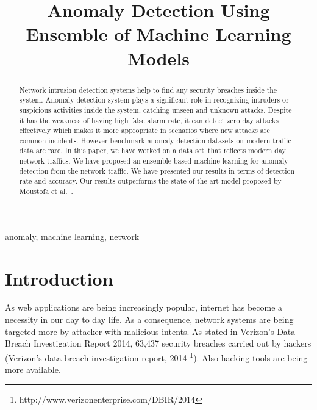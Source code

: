 \documentclass[14pt, conference]{IEEEtran}
\begin{document}
\title{Anomaly Detection Using Ensemble of Machine Learning Models}

\author{
}

\maketitle

\begin{abstract}

Network intrusion detection systems help to find any security breaches inside the system. Anomaly detection system plays a significant role in recognizing intruders or suspicious activities inside the system, catching unseen and unknown attacks. Despite it has the weakness of having high false alarm rate, it can detect zero day attacks effectively which makes it more appropriate in scenarios where new attacks are common incidents. However benchmark anomaly detection datasets on modern traffic data are rare. In this paper, we have  worked on a data set\cite{moustafa2015unsw}~that reflects modern day network traffics. We have proposed  an ensemble based machine learning for anomaly detection from the network traffic. We have presented our results in terms of detection rate and accuracy. Our results outperforms the state of the art model proposed by Moustofa et al.~\cite{moustafa2018anomaly}.
\end{abstract}

\begin{IEEEkeywords}
anomaly, machine learning, network
\end{IEEEkeywords}

\section{Introduction}

As web applications are being increasingly popular, internet has become a necessity in our day to day life. As a consequence, network systems are being targeted more by attacker with malicious intents. As stated in Verizon's Data Breach Investigation Report 2014, 63,437 security breaches carried out by hackers (Verizon's data breach investigation report, 2014 \footnote{http://www.verizonenterprise.com/DBIR/2014}). Also hacking tools are being more available.
\end{document}

